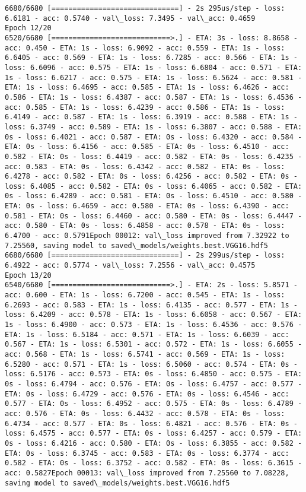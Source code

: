 \documentclass[11pt]{article}
\begin{document}
\begin{Verbatim}[commandchars=\\\{\}]
6680/6680 [==============================] - 2s 295us/step - loss: 6.6181 - acc: 0.5740 - val\_loss: 7.3495 - val\_acc: 0.4659
Epoch 12/20
6520/6680 [============================>.] - ETA: 3s - loss: 8.8658 - acc: 0.450 - ETA: 1s - loss: 6.9092 - acc: 0.559 - ETA: 1s - loss: 6.6405 - acc: 0.569 - ETA: 1s - loss: 6.7285 - acc: 0.566 - ETA: 1s - loss: 6.6096 - acc: 0.575 - ETA: 1s - loss: 6.6804 - acc: 0.571 - ETA: 1s - loss: 6.6217 - acc: 0.575 - ETA: 1s - loss: 6.5624 - acc: 0.581 - ETA: 1s - loss: 6.4695 - acc: 0.585 - ETA: 1s - loss: 6.4626 - acc: 0.586 - ETA: 1s - loss: 6.4387 - acc: 0.587 - ETA: 1s - loss: 6.4536 - acc: 0.585 - ETA: 1s - loss: 6.4239 - acc: 0.586 - ETA: 1s - loss: 6.4149 - acc: 0.587 - ETA: 1s - loss: 6.3919 - acc: 0.588 - ETA: 1s - loss: 6.3749 - acc: 0.589 - ETA: 1s - loss: 6.3807 - acc: 0.588 - ETA: 0s - loss: 6.4021 - acc: 0.587 - ETA: 0s - loss: 6.4320 - acc: 0.584 - ETA: 0s - loss: 6.4156 - acc: 0.585 - ETA: 0s - loss: 6.4510 - acc: 0.582 - ETA: 0s - loss: 6.4419 - acc: 0.582 - ETA: 0s - loss: 6.4235 - acc: 0.583 - ETA: 0s - loss: 6.4342 - acc: 0.582 - ETA: 0s - loss: 6.4278 - acc: 0.582 - ETA: 0s - loss: 6.4256 - acc: 0.582 - ETA: 0s - loss: 6.4085 - acc: 0.582 - ETA: 0s - loss: 6.4065 - acc: 0.582 - ETA: 0s - loss: 6.4289 - acc: 0.581 - ETA: 0s - loss: 6.4510 - acc: 0.580 - ETA: 0s - loss: 6.4659 - acc: 0.580 - ETA: 0s - loss: 6.4390 - acc: 0.581 - ETA: 0s - loss: 6.4460 - acc: 0.580 - ETA: 0s - loss: 6.4447 - acc: 0.580 - ETA: 0s - loss: 6.4858 - acc: 0.578 - ETA: 0s - loss: 6.4700 - acc: 0.5791Epoch 00012: val\_loss improved from 7.32922 to 7.25560, saving model to saved\_models/weights.best.VGG16.hdf5
6680/6680 [==============================] - 2s 299us/step - loss: 6.4922 - acc: 0.5774 - val\_loss: 7.2556 - val\_acc: 0.4575
Epoch 13/20
6540/6680 [============================>.] - ETA: 2s - loss: 5.8571 - acc: 0.600 - ETA: 1s - loss: 6.7200 - acc: 0.545 - ETA: 1s - loss: 6.2693 - acc: 0.583 - ETA: 1s - loss: 6.4135 - acc: 0.577 - ETA: 1s - loss: 6.4209 - acc: 0.578 - ETA: 1s - loss: 6.6058 - acc: 0.567 - ETA: 1s - loss: 6.4900 - acc: 0.573 - ETA: 1s - loss: 6.4536 - acc: 0.576 - ETA: 1s - loss: 6.5184 - acc: 0.571 - ETA: 1s - loss: 6.6039 - acc: 0.567 - ETA: 1s - loss: 6.5301 - acc: 0.572 - ETA: 1s - loss: 6.6055 - acc: 0.568 - ETA: 1s - loss: 6.5741 - acc: 0.569 - ETA: 1s - loss: 6.5280 - acc: 0.571 - ETA: 1s - loss: 6.5060 - acc: 0.574 - ETA: 0s - loss: 6.5176 - acc: 0.573 - ETA: 0s - loss: 6.4850 - acc: 0.575 - ETA: 0s - loss: 6.4794 - acc: 0.576 - ETA: 0s - loss: 6.4757 - acc: 0.577 - ETA: 0s - loss: 6.4729 - acc: 0.576 - ETA: 0s - loss: 6.4546 - acc: 0.577 - ETA: 0s - loss: 6.4952 - acc: 0.575 - ETA: 0s - loss: 6.4789 - acc: 0.576 - ETA: 0s - loss: 6.4432 - acc: 0.578 - ETA: 0s - loss: 6.4734 - acc: 0.577 - ETA: 0s - loss: 6.4821 - acc: 0.576 - ETA: 0s - loss: 6.4575 - acc: 0.577 - ETA: 0s - loss: 6.4257 - acc: 0.579 - ETA: 0s - loss: 6.4216 - acc: 0.580 - ETA: 0s - loss: 6.3855 - acc: 0.582 - ETA: 0s - loss: 6.3745 - acc: 0.583 - ETA: 0s - loss: 6.3774 - acc: 0.582 - ETA: 0s - loss: 6.3752 - acc: 0.582 - ETA: 0s - loss: 6.3615 - acc: 0.5827Epoch 00013: val\_loss improved from 7.25560 to 7.08228, saving model to saved\_models/weights.best.VGG16.hdf5

\end{Verbatim}
\end{document}
